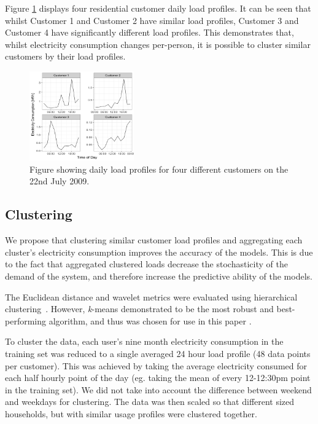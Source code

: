 Figure \ref{fig:similar_customers} displays four residential customer daily load profiles. It can be seen that whilst Customer 1 and Customer 2 have similar load profiles, Customer 3 and Customer 4 have significantly different load profiles.  This demonstrates that, whilst electricity consumption changes per-person, it is possible to cluster similar customers by their load profiles.
\begin{figure}[b]
	\includegraphics[width=0.4\textwidth]{figures/Webp_net-resizeimage.png}
	\caption{Figure showing daily load profiles for four different customers on the 22nd July 2009.}
	\label{fig:similar_customers}
\end{figure}
\subsection{Clustering}

We propose that clustering similar customer load profiles and aggregating each cluster's electricity consumption improves the accuracy of the models. This is due to the fact that aggregated clustered loads decrease the stochasticity of the demand of the system, and therefore increase the predictive ability of the models.

The Euclidean distance and wavelet metrics were evaluated using hierarchical clustering~\cite{BIMJ:BIMJ4710240520}. However, \textit{k}-means demonstrated to be the most robust and best-performing algorithm, and thus was chosen for use in this paper \cite{Forgy65}.

To cluster the data, each user's nine month electricity consumption in the training set was reduced to a single averaged 24 hour load profile (48 data points per customer). This was achieved by taking the average electricity consumed for each half hourly point of the day (eg. taking the mean of every 12-12:30pm point in the training set). We did not take into account the difference between weekend and weekdays for clustering. The data was then scaled so that different sized households, but with similar usage profiles were clustered together.

